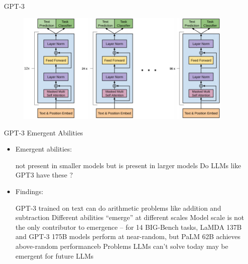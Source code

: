 \documentclass[serif, aspectratio=169]{beamer}
\begin{document}
\begin{frame}{GPT-3}
    \hspace{0.4cm}
    \begin{figure}
        \centering
        \includegraphics[width=0.95\textwidth]{pic/GPT-3.png}
        \caption{}
    \end{figure}
\end{frame}

\begin{frame}{GPT-3}
    \Large{Emergent Abilities}
    \vspace{0.5cm}
    \begin{itemize}
        \item
            \large{Emergent abilities:}
                \begin{outline}
                    \1 not present in smaller models but is present in larger models
                    \1 Do LLMs like GPT3 have these ?
                \end{outline}   
            \vspace{0.1cm}
        \item
            \large{Findings:}
            \begin{outline}
                \1 GPT-3 trained on text can do arithmetic problems like addition and subtraction
                \1 Different abilities “emerge” at different scales
                \1 Model scale is not the only contributor to emergence – for 14 BIG-Bench tasks, LaMDA 137B and GPT-3 175B models perform at near-random, but PaLM 62B achieves above-random performanceb
                \1 Problems LLMs can’t solve today may be emergent for future LLMs
            \end{outline}
    \end{itemize}
\end{frame}
\end{document}
